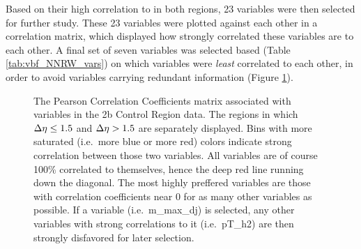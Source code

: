     Based on their high correlation to \mhh in both \deta regions, 23 variables were then selected for further study.
    These 23 variables were plotted against each other in a correlation matrix,
        which displayed how strongly correlated these variables are to each other.
    A final set of seven variables was selected based (Table \ref{tab:vbf_NNRW_vars}) on which variables were \textit{least} correlated to each other,
        in order to avoid variables carrying redundant information (Figure \ref{fig:vbf_corr_matrix}).

    \begin{figure}[!htbp]
        \caption{
            The Pearson Correlation Coefficients matrix associated with variables in the 2b Control Region data.
            The regions in which $\Delta \eta \leq 1.5$ and $\Delta \eta>1.5$ are separately displayed.
            Bins with more saturated (i.e.\ more blue or more red) colors indicate strong correlation between those two variables.
            All variables are of course 100\% correlated to themselves, hence the deep red line running down the diagonal.
            The most highly preffered variables are those with correlation coefficients near 0 for as many other variables as possible.
            If a variable (i.e.\ m\_max\_dj) is selected, any other variables with strong correlations to it (i.e.\ pT\_h2)
                are then strongly disfavored for later selection.
        }
        \label{fig:vbf_corr_matrix}
    \end{figure}


